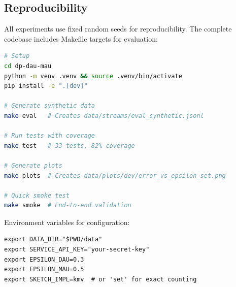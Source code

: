 \documentclass[11pt]{article}
\begin{document}
\begin{appendices}
\section{Reproducibility}
\label{appendix:repro}

All experiments use fixed random seeds for reproducibility. The complete codebase includes Makefile targets for evaluation:

\begin{lstlisting}[language=bash]
# Setup
cd dp-dau-mau
python -m venv .venv && source .venv/bin/activate
pip install -e ".[dev]"

# Generate synthetic data
make eval   # Creates data/streams/eval_synthetic.jsonl

# Run tests with coverage
make test   # 33 tests, 82% coverage

# Generate plots
make plots  # Creates data/plots/dev/error_vs_epsilon_set.png

# Quick smoke test
make smoke  # End-to-end validation
\end{lstlisting}

Environment variables for configuration:
\begin{lstlisting}
export DATA_DIR="$PWD/data"
export SERVICE_API_KEY="your-secret-key"
export EPSILON_DAU=0.3
export EPSILON_MAU=0.5
export SKETCH_IMPL=kmv  # or 'set' for exact counting
\end{lstlisting}

\end{appendices}


\newpage
\end{document}
